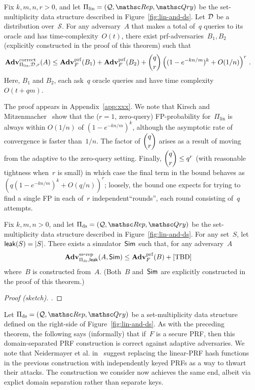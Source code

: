 \begin{theorem}\label{thm1}\label{thm:lin-correctness}
Fix $k,m,n,r>0$, and let $\Pi_{\mathrm{lin}}= (\calQ,\Rep, \Qry)$ be the set-multiplicity data structure described in Figure~\ref{fig:lin-and-ds}. Let $\mathcal{D}_{}^{}$ be a distribution over~$\mathcal{S}$.  For any adversary~$A$ that makes a total of~$q$ queries to its oracle and has time-complexity~$O(t)$, there exist prf-adversaries~$B_1,B_2$ (explicitly constructed in the proof of this theorem) such that
\[
\mathrm{\mathbf{Adv}}^{\mathrm{correct}}_{\Pi_{\mathrm{lin}},\mathcal{D}_{}^{},r}(A) \leq  \mathbf{Adv}^{\mathrm{prf}}_{F}(B_1) + \mathbf{Adv}^{\mathrm{prf}}_{F}(B_2)  +{\dbinom{q}{r}} \left( (1-e^{-kn/m})^k + O(1/n) \right)^r\,.
\]
Here, $B_1$ and $B_2$, each ask~$q$ oracle queries and have time complexity~$O(t+qm)$.
\end{theorem}
The proof appears in Appendix~\ref{app:xxx}.  We note that Kirsch and Mitzenmacher~\cite{xxx} show
that the ($r=1$, zero-query) FP-probability for~$\Pi_\mathrm{lin}$ is
always within $O(1/n)$ of $(1-e^{-kn/m})^k$, although the asymptotic
rate of convergence is faster than~$1/n$.  The factor of $\dbinom{q}{r}$ arises as a result
of moving from the adaptive to the zero-query setting.  Finally, $\dbinom{q}{r} \leq q^r$ (with
reasonable tightness when~$r$ is small) in which case the final term in the bound behaves as
$(q (1-e^{-kn/m})^k + O(q/n) )^r$; loosely, the bound one expects for
trying to find a single FP in each of~$r$ independent``rounds'', each round
consisting of~$q$ attempts.

\begin{theorem}\label{thm:lin-ss}
Fix $k,m,n>0$, and let $\Pi_{\mathrm{ds}}= (\calQ,\Rep, \Qry)$ be the set-multiplicity data structure described in Figure~\ref{fig:lin-and-ds}.  For any set~$S$, let ${\sf leak}(S)=|S|$.  There exists a simulator~${\sf Sim}$ such that, for any adversary~$A$
\[
\mathrm{\mathbf{Adv}}^{\mathrm{ss\mbox{-}rep}}_{\Pi_{\mathrm{ds}},{\sf leak}}(A,{\sf Sim}) \leq  \mathbf{Adv}^{\mathrm{prf}}_{F}(B) + \mbox{[TBD]}
\]
where~$B$ is constructed from~$A$.  (Both~$B$ and~${\sf Sim}$ are explicitly constructed in the proof of this theorem.)
\end{theorem}
\begin{proof}[Proof (sketch). ]
\end{proof}


Let $\Pi_{\mathrm{ds}}= (\calQ,\Rep, \Qry)$ be a set-multiplicity data structure defined on the right-side of Figure~\ref{fig:lin-and-ds}.  As with the preceding theorem, the following says (informally) that if~$F$ is a secure PRF, then this domain-separated PRF construction is correct against adaptive adversaries.  We note that Neidermayer et al. in~\cite{xxx} suggest replacing the linear-PRF hash functions in the previous construction with independently keyed PRFs as a way to thwart their attacks.  The construction we consider now achieves the same end, albeit via explict domain separation rather than separate keys.


